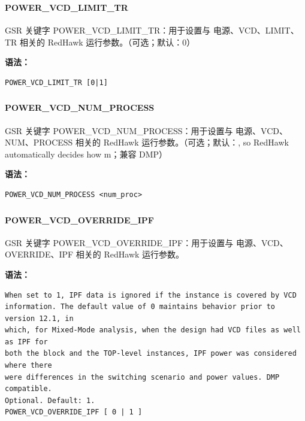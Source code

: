 \subsubsection{}
\paragraph*{POWER_VCD_LIMIT_TR}

GSR 关键字 POWER_VCD_LIMIT_TR：用于设置与 电源、VCD、LIMIT、TR 相关的 RedHawk 运行参数。（可选；默认：0）

\textbf{语法：}
\begin{lstlisting}
POWER_VCD_LIMIT_TR [0|1]
\end{lstlisting}

\subsubsection{}
\paragraph*{POWER_VCD_NUM_PROCESS}

GSR 关键字 POWER_VCD_NUM_PROCESS：用于设置与 电源、VCD、NUM、PROCESS 相关的 RedHawk 运行参数。（可选；默认：, so RedHawk automatically decides how m；兼容 DMP）

\textbf{语法：}
\begin{lstlisting}
POWER_VCD_NUM_PROCESS <num_proc>
\end{lstlisting}

\subsubsection{}
\paragraph*{POWER_VCD_OVERRIDE_IPF}

GSR 关键字 POWER_VCD_OVERRIDE_IPF：用于设置与 电源、VCD、OVERRIDE、IPF 相关的 RedHawk 运行参数。

\textbf{语法：}
\begin{lstlisting}
When set to 1, IPF data is ignored if the instance is covered by VCD
information. The default value of 0 maintains behavior prior to version 12.1, in
which, for Mixed-Mode analysis, when the design had VCD files as well as IPF for
both the block and the TOP-level instances, IPF power was considered where there
were differences in the switching scenario and power values. DMP compatible.
Optional. Default: 1.
POWER_VCD_OVERRIDE_IPF [ 0 | 1 ]
\end{lstlisting}


